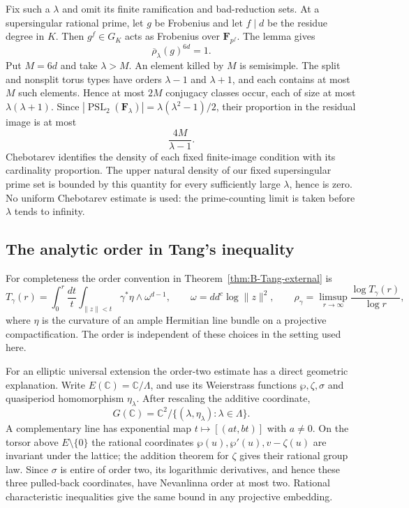 Fix such a $\lambda$ and omit its finite ramification and
bad-reduction sets.  At a supersingular rational prime, let $g$
be Frobenius and let $f\mid d$ be the residue degree in $K$.
Then $g^f\in G_K$ acts as Frobenius over $\mathbf F_{p^f}$.
The lemma gives
\[
                 \overline\rho_\lambda(g)^{6d}=1.
\]
Put $M=6d$ and take $\lambda>M$.  An element killed by $M$ is
semisimple.  The split and nonsplit torus types have orders
$\lambda-1$ and $\lambda+1$, and each contains at most $M$
such elements.  Hence at most $2M$ conjugacy classes occur,
each of size at most $\lambda(\lambda+1)$.  Since
$|\operatorname{PSL}_2(\mathbf F_\lambda)|
=\lambda(\lambda^2-1)/2$, their proportion in the residual
image is at most
\[
                         \frac{4M}{\lambda-1}.
\]
Chebotarev identifies the density of each fixed finite-image
condition with its cardinality proportion.  The upper natural
density of our fixed supersingular prime set is bounded by this
quantity for every sufficiently large $\lambda$, hence is zero.
No uniform Chebotarev estimate is used: the prime-counting limit
is taken before $\lambda$ tends to infinity.

\subsection{The analytic order in Tang's inequality}
\label{subsec:B-growth-sharp}
For completeness the order convention in
Theorem~\ref{thm:B-Tang-external} is
\[
 T_\gamma(r)=\int_0^r\frac{dt}{t}
       \int_{\|z\|<t}\gamma^*\eta\wedge\omega^{d-1},
 \qquad\omega=dd^c\log\|z\|^2,
 \qquad\rho_\gamma=\limsup_{r\to\infty}
                         \frac{\log T_\gamma(r)}{\log r},
\]
where $\eta$ is the curvature of an ample Hermitian line bundle
on a projective compactification.  The order is independent of
these choices in the setting used here.

For an elliptic universal extension the order-two estimate has
a direct geometric explanation.  Write
$E(\mathbb C)=\mathbb C/\Lambda$, and use its Weierstrass
functions $\wp,\zeta,\sigma$ and quasiperiod homomorphism
$\eta_\lambda$.  After rescaling the additive coordinate,
\[
 G(\mathbb C)=\mathbb C^2/
           \{(\lambda,\eta_\lambda):\lambda\in\Lambda\}.
\]
A complementary line has exponential map
$t\mapsto[(at,bt)]$ with $a\ne0$.  On the torsor above
$E\setminus\{0\}$ the rational coordinates
$\wp(u),\wp'(u),v-\zeta(u)$ are invariant under the lattice;
the addition theorem for $\zeta$ gives their rational group law.
Since $\sigma$ is entire of order two, its logarithmic
derivatives, and hence these three pulled-back coordinates, have
Nevanlinna order at most two.  Rational characteristic inequalities
give the same bound in any projective embedding.

